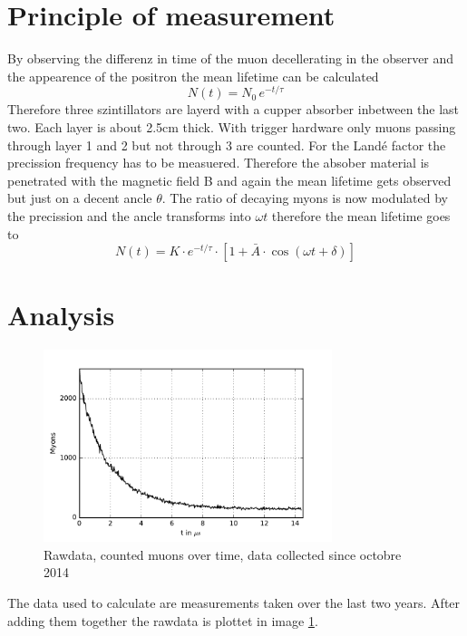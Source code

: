 \documentclass{include/thesisclass3}
\begin{document}
\section{Principle of measurement}
By observing the differenz in time of the muon decellerating in the observer and the appearence of the positron the mean lifetime can be calculated
\begin{equation}
N(t)=N_0\,e^{-t/\tau}
\end{equation}
Therefore three szintillators are layerd with a cupper absorber inbetween the last two. Each layer is about 2.5cm thick. With trigger hardware only muons passing through layer 1 and 2 but not through 3 are counted. 
For the Landé factor the precission frequency has to be measuered. Therefore the absober material is penetrated with the magnetic field B and again the mean lifetime gets observed but just on a decent ancle $\theta$. The ratio of decaying myons is now modulated by the precission and the ancle transforms into $\omega t$ therefore the mean lifetime goes to 
\begin{equation}
N(t)=K\cdot e^{ -t/\tau } \cdot [ 1+\bar A \cdot \cos(\omega t + \delta )]\label{n(t)}
\end{equation}

\section{Analysis}
\begin{figure}[hb]
	\begin{center}
		\includegraphics[width=0.75\textwidth]{images/raw.pdf}
		\caption{Rawdata, counted muons over time, data collected since octobre 2014}
		\label{raw}
	\end{center}
\end{figure}
The data used to calculate are measurements taken over the last two years. After adding them together the rawdata is plottet in image \ref{raw}.
\end{document}
